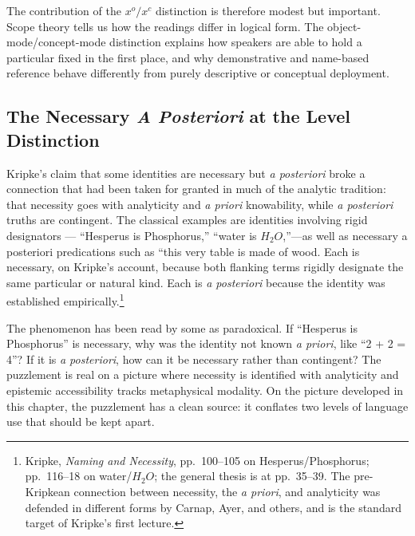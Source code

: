 \documentclass[12pt,a4paper]{article}
\begin{document}
The contribution of the \(x^o/x^c\) distinction is therefore modest but important. Scope theory tells us how the readings differ in logical form. The object-mode/concept-mode distinction explains how speakers are able to hold a particular fixed in the first place, and why demonstrative and name-based reference behave differently from purely descriptive or conceptual deployment.

\subsection{\texorpdfstring{The Necessary \emph{A Posteriori} at the Level Distinction}{The Necessary A Posteriori at the Level Distinction}}\label{the-necessary-a-posteriori-at-the-level-distinction}

Kripke's claim that some identities are necessary but \emph{a posteriori} broke a connection that had been taken for granted in much of the analytic tradition: that necessity goes with analyticity and \emph{a priori} knowability, while \emph{a posteriori} truths are contingent. The classical examples are identities involving rigid designators --- ``Hesperus is Phosphorus,'' ``water is \(H_2O\),''---as well as necessary a posteriori predications such as ``this very table is made of wood. Each is necessary, on Kripke's account, because both flanking terms rigidly designate the same particular or natural kind. Each is \emph{a posteriori} because the identity was established empirically.\footnote{Kripke, \emph{Naming and Necessity}, pp.~100--105 on Hesperus/Phosphorus; pp.~116--18 on water/\(H_2O\); the general thesis is at pp.~35--39. The pre-Kripkean connection between necessity, the \emph{a priori}, and analyticity was defended in different forms by Carnap, Ayer, and others, and is the standard target of Kripke's first lecture.}

The phenomenon has been read by some as paradoxical. If ``Hesperus is Phosphorus'' is necessary, why was the identity not known \emph{a priori}, like ``2 + 2 = 4''? If it is \emph{a posteriori}, how can it be necessary rather than contingent? The puzzlement is real on a picture where necessity is identified with analyticity and epistemic accessibility tracks metaphysical modality. On the picture developed in this chapter, the puzzlement has a clean source: it conflates two levels of language use that should be kept apart.
\end{document}
